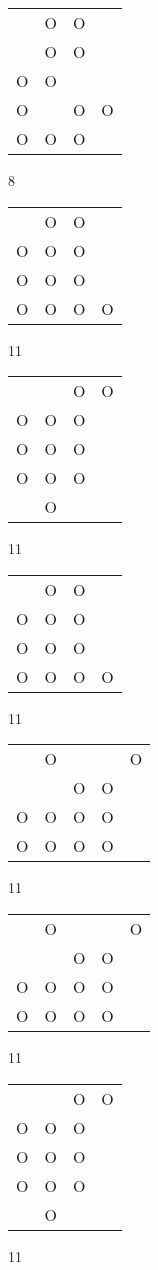 \begin{tabular}{|m{0.2cm}m{0.2cm}m{0.2cm}m{0.2cm}|}\hline
 &O&O& \\
 &O&O& \\
O&O& & \\
O& &O&O\\
O&O&O& \\
\hline\end{tabular}8
\begin{tabular}{|m{0.2cm}m{0.2cm}m{0.2cm}m{0.2cm}|}\hline
 &O&O& \\
O&O&O& \\
O&O&O& \\
O&O&O&O\\
\hline\end{tabular}11
\begin{tabular}{|m{0.2cm}m{0.2cm}m{0.2cm}m{0.2cm}|}\hline
 & &O&O\\
O&O&O& \\
O&O&O& \\
O&O&O& \\
 &O& & \\
\hline\end{tabular}11
\begin{tabular}{|m{0.2cm}m{0.2cm}m{0.2cm}m{0.2cm}|}\hline
 &O&O& \\
O&O&O& \\
O&O&O& \\
O&O&O&O\\
\hline\end{tabular}11
\begin{tabular}{|m{0.2cm}m{0.2cm}m{0.2cm}m{0.2cm}m{0.2cm}|}\hline
 &O& & &O\\
 & &O&O& \\
O&O&O&O& \\
O&O&O&O& \\
\hline\end{tabular}11
\begin{tabular}{|m{0.2cm}m{0.2cm}m{0.2cm}m{0.2cm}m{0.2cm}|}\hline
 &O& & &O\\
 & &O&O& \\
O&O&O&O& \\
O&O&O&O& \\
\hline\end{tabular}11
\begin{tabular}{|m{0.2cm}m{0.2cm}m{0.2cm}m{0.2cm}|}\hline
 & &O&O\\
O&O&O& \\
O&O&O& \\
O&O&O& \\
 &O& & \\
\hline\end{tabular}11
